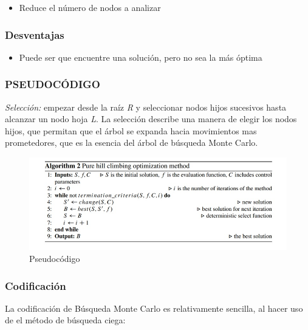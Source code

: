 \documentclass[11pt,]{article}
\providecommand{\tightlist}{%
\setlength{\itemsep}{0pt}\setlength{\parskip}{0pt}}
\begin{document}
\begin{itemize}
\tightlist
\item
  Reduce el número de nodos a analizar
\end{itemize}

\hypertarget{desventajas}{%
\subsubsection{Desventajas}\label{desventajas}}

\begin{itemize}
\tightlist
\item
  Puede ser que encuentre una solución, pero no sea la más óptima
\end{itemize}

\hypertarget{pseudocuxf3digo}{%
\subsubsection{PSEUDOCÓDIGO}\label{pseudocuxf3digo}}

\emph{Selección:} empezar desde la raíz \emph{R} y seleccionar nodos
hijos sucesivos hasta alcanzar un nodo hoja \emph{L}. La selección
describe una manera de elegir los nodos hijos, que permitan que el árbol
se expanda hacia movimientos mas prometedores, que es la esencia del
árbol de búsqueda Monte Carlo.

\begin{figure}
\centering
\includegraphics{./imagenes/pseudocodigo.jpg}
\caption{Pseudocódigo}
\end{figure}

\newpage

\hypertarget{codificaciuxf3n}{%
\subsubsection{Codificación}\label{codificaciuxf3n}}

La codificación de Búsqueda Monte Carlo es relativamente sencilla, al
hacer uso de el método de búsqueda ciega:
\end{document}
